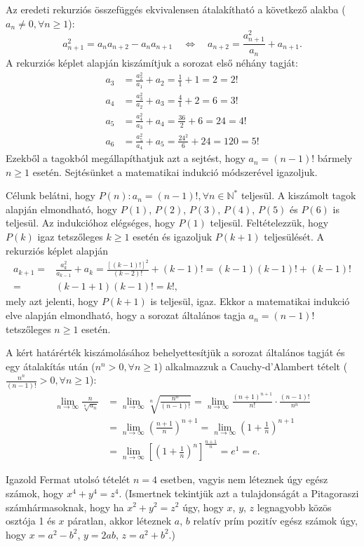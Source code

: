 \begin{solution}
Az eredeti rekurziós összefüggés ekvivalensen átalakítható a következő
alakba ($a_{n}\neq0,\forall n\geq1$): 
\[
a_{n+1}^{2}=a_{n}a_{n+2}-a_{n}a_{n+1}\quad\iff\quad a_{n+2}=\frac{a_{n+1}^{2}}{a_{n}}+a_{n+1}.
\]
A rekurziós képlet alapján kiszámítjuk a sorozat első néhány tagját:
\begin{align*}
a_{3} & =\frac{a_{2}^{2}}{a_{1}}+a_{2}=\frac{1}{1}+1=2=2!\\
a_{4} & =\frac{a_{3}^{2}}{a_{2}}+a_{3}=\frac{4}{1}+2=6=3!\\
a_{5} & =\frac{a_{4}^{2}}{a_{3}}+a_{4}=\frac{36}{2}+6=24=4!\\
a_{6} & =\frac{a_{5}^{2}}{a_{4}}+a_{5}=\frac{24^{2}}{6}+24=120=5!
\end{align*}
Ezekből a tagokból megállapíthatjuk azt a sejtést, hogy $a_{n}=(n-1)!$
bármely $n\geq1$ esetén. Sejtésünket a matematikai indukció módszerével
igazoljuk.

Célunk belátni, hogy $P(n):a_{n}=(n-1)!,\forall n\in\mathbb{N^{*}}$
teljesül. A kiszámolt tagok alapján elmondható, hogy $P(1)$, $P(2)$,
$P(3)$, $P(4)$, $P(5)$ és $P(6)$ is teljesül. Az indukcióhoz elégséges,
hogy $P(1)$ teljesül. Feltételezzük, hogy $P(k)$ igaz tetszőleges
$k\geq1$ esetén és igazoljuk $P(k+1)$ teljesülését. A rekurziós
képlet alapján 
\[
\begin{aligned}a_{k+1}= & \frac{a_{k}^{2}}{a_{k-1}}+a_{k}=\frac{[(k-1)!]^{2}}{(k-2)!}+(k-1)!=(k-1)(k-1)!+(k-1)!\\
= & (k-1+1)(k-1)!=k!,
\end{aligned}
\]
mely azt jelenti, hogy $P(k+1)$ is teljesül, igaz. Ekkor a matematikai
indukció elve alapján elmondható, hogy a sorozat általános tagja $a_{n}=(n-1)!$
tetszőleges $n\geq1$ esetén.

A kért határérték kiszámolásához behelyettesítjük a sorozat általános
tagját és egy átalakítás után ($n^{n}>0,\forall n\geq1$) alkalmazzuk
a Cauchy-d'Alambert tételt \Big($\frac{n^{n}}{(n-1)!}>0,\forall n\geq1$\Big):
\begin{align*}
\lim\limits_{n\to\infty}\frac{n}{\sqrt[n]{a_{n}}} & =\lim\limits_{n\to\infty}\sqrt[n]{\frac{n^{n}}{(n-1)!}}=\lim\limits_{n\to\infty}\frac{(n+1)^{n+1}}{n!}\cdot\frac{(n-1)!}{n^{n}}\\
 & =\lim\limits_{n\to\infty}\left(\frac{n+1}{n}\right)^{n+1}=\lim\limits_{n\to\infty}\left(1+\frac{1}{n}\right)^{n+1}\\
 & =\lim\limits_{n\to\infty}\left[\left(1+\frac{1}{n}\right)^{n}\right]^{\frac{n+1}{n}}=e^{1}=e.
\end{align*}
\end{solution}
\begin{extraproblem}
Igazold Fermat utolsó tételét $n=4$ esetben, vagyis nem léteznek
úgy egész számok, hogy $x^{4}+y^{4}=z^{4}$. (Ismertnek tekintjük
azt a tulajdonságát a Pitagoraszi számhármasoknak, hogy ha $x^{2}+y^{2}=z^{2}$
úgy, hogy $x$, $y$, $z$ legnagyobb közös osztója 1 és $x$ páratlan,
akkor léteznek $a$, $b$ relatív prím pozitív egész számok úgy, hogy
$x=a^{2}-b^{2}$, $y=2ab$, $z=a^{2}+b^{2}$.) 
\end{extraproblem}

